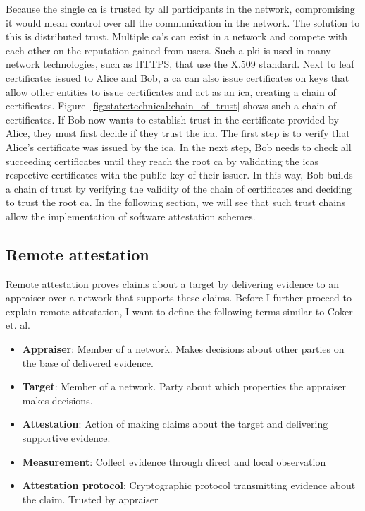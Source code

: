 Because the single \gls{ca} is trusted by all participants in the network,
compromising it would mean control over all the communication in the network.
The solution to this is distributed trust. Multiple \gls{ca}'s can exist in a
network and compete with each other on the reputation gained from
users.\cite{perlman1999overview} Such a \gls{pki} is used in many network
technologies, such as HTTPS, that use the X.509 standard. Next to leaf
certificates issued to Alice and Bob, a \gls{ca} can also issue certificates on
keys that allow other entities to issue certificates and act as an \gls{ica},
creating a chain of certificates.
Figure~\ref{fig:state:technical:chain_of_trust} shows such a chain of
certificates. If Bob now wants to establish trust in the certificate provided by
Alice, they must first decide if they trust the \gls{ica}. The first step is to
verify that Alice's certificate was issued by the \gls{ica}. In the next step,
Bob needs to check all succeeding certificates until they reach the root
\gls{ca} by validating the \gls{ica}s respective certificates with the public
key of their issuer. In this way, Bob builds a chain of trust by verifying the
validity of the chain of certificates and deciding to trust the root \gls{ca}.
In the following section, we will see that such trust chains allow the
implementation of software attestation schemes.

\subsection{Remote attestation}
\label{sec:20:remote_attestation}
Remote attestation proves claims about a target
by delivering evidence to an appraiser over a network that supports these
claims. Before I further proceed to explain remote attestation, I want to
define the following terms similar to Coker et. al.\cite{coker_principles_2011}
\begin{itemize}
    \item \textbf{Appraiser}: Member of a network. Makes decisions about other
          parties on the base of delivered evidence.
    \item \textbf{Target}: Member of a network. Party about which properties the
          appraiser makes decisions.
    \item \textbf{Attestation}: Action of making claims about the target and
          delivering supportive evidence.
    \item \textbf{Measurement}: Collect evidence through direct and local
          observation
    \item \textbf{Attestation protocol}: Cryptographic protocol transmitting
          evidence about the claim. Trusted by appraiser
\end{itemize}

